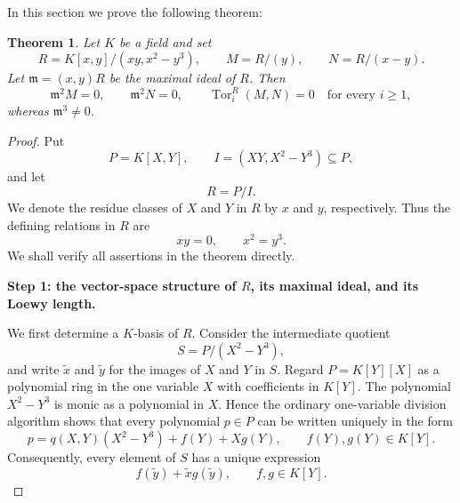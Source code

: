 \documentclass[a4paper]{amsart}
\newtheorem{theorem}{Theorem}[section]
\theoremstyle{definition}
\theoremstyle{remark}
\numberwithin{equation}{section}
\newcommand{\Tor}{\operatorname{Tor}}
\begin{document}
In this section we prove the following theorem:
\begin{theorem}
Let $K$ be a field and set
\[
 R=K[x,y]/(xy,x^2-y^3),\qquad
 M=R/(y),\qquad
 N=R/(x-y).
\]
Let $\mathfrak m=(x,y)R$ be the maximal ideal of $R$.  Then
\[
 \mathfrak m^2M=0,\qquad
 \mathfrak m^2N=0,\qquad
 \Tor_i^R(M,N)=0\quad\text{for every }i\geq1,
\]
whereas $\mathfrak m^3\neq0$.
\end{theorem}
\begin{proof}
Put
\[
 P=K[X,Y],\qquad I=(XY,X^2-Y^3)\subseteq P,
\]
and let
\[
 R=P/I.
\]
We denote the residue classes of $X$ and $Y$ in $R$ by $x$ and $y$,
respectively.  Thus the defining relations in $R$ are
\begin{equation}\label{eq:defining-relations}
 xy=0,
 \qquad
 x^2=y^3.
\end{equation}
We shall verify all assertions in the theorem directly.

\medskip
\noindent
\textbf{Step 1: the vector-space structure of $R$, its maximal ideal,
and its Loewy length.}

We first determine a $K$-basis of $R$.
Consider the intermediate quotient
\[
 S=P/(X^2-Y^3),
\]
and write $\widetilde x$ and $\widetilde y$ for the images of $X$ and
$Y$ in $S$.  Regard $P=K[Y][X]$ as a polynomial ring in the one
variable $X$ with coefficients in $K[Y]$.  The polynomial
$X^2-Y^3$ is monic as a polynomial in $X$.  Hence the ordinary
one-variable division algorithm shows that every polynomial
$p\in P$ can be written uniquely in the form
\[
 p=q(X,Y)(X^2-Y^3)+f(Y)+Xg(Y),
 \qquad f(Y),g(Y)\in K[Y].
\]
Consequently, every element of $S$ has a unique expression
\begin{equation}\label{eq:S-normal-form}
 f(\widetilde y)+\widetilde x g(\widetilde y),
 \qquad f,g\in K[Y].
\end{equation}


\end{proof}
\end{document}
